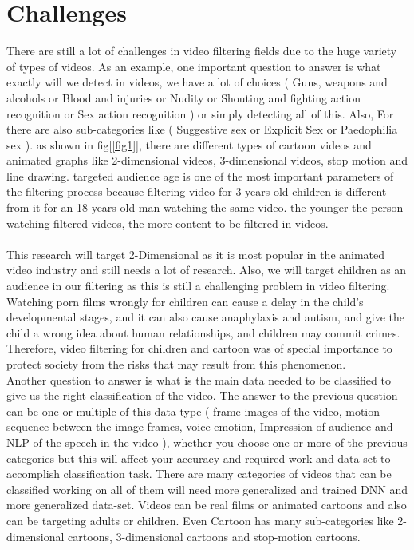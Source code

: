 \documentclass[runningheads]{llncs}
\begin{document}
\section{Challenges}
There are still a lot of challenges in video filtering fields due to the huge variety of types of videos. As an example, one important question to answer is what exactly will we detect in videos, we have a lot of choices ( Guns, weapons and alcohols or Blood and injuries or Nudity or Shouting and fighting action recognition or Sex action recognition ) or simply detecting all of this. Also, For there are also sub-categories like ( Suggestive sex or Explicit Sex or Paedophilia sex ). as shown in fig[\ref{fig1}], there are different types of cartoon videos and animated graphs like 2-dimensional videos, 3-dimensional videos, stop motion and line drawing. targeted audience age is one of the most important parameters of the filtering process because filtering video for 3-years-old children is different from it for an 18-years-old man watching the same video. the younger the person watching filtered videos, the more content to be filtered in videos.\\\\ This research will target 2-Dimensional as it is most popular in the animated video industry and still needs a lot of research. Also, we will target children as an audience in our filtering as this is still a challenging problem in video filtering. Watching porn films wrongly for children can cause a delay in the child's developmental stages, and it can also cause anaphylaxis and autism, and give the child a wrong idea about human relationships, and children may commit crimes. Therefore, video filtering for children and cartoon was of special importance to protect society from the risks that may result from this phenomenon.\\
Another question to answer is what is the main data needed to be classified to give us the right classification of the video. The answer to the previous question can be one or multiple of this data type ( frame images of the video, motion sequence between the image frames, voice emotion, Impression of audience and NLP of the speech in the video ), whether you choose one or more of the previous categories but this will affect your accuracy and required work and data-set to accomplish classification task. There are many categories of videos that can be classified working on all of them will need more generalized and trained DNN and more generalized data-set. Videos can be real films or animated cartoons and also can be targeting adults or children. Even Cartoon has many sub-categories like 2-dimensional cartoons, 3-dimensional cartoons and stop-motion cartoons.\\
\end{document}
